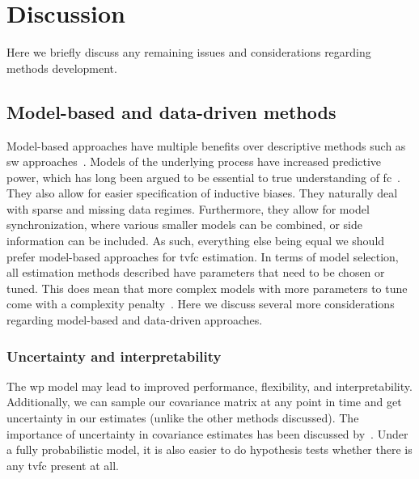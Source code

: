 \clearpage
\section{Discussion}\label{sec:methods-discussion}

Here we briefly discuss any remaining issues and considerations regarding methods development.

\subsection{Model-based and data-driven methods}\label{subsec:model-based-data-driven-methods}

Model-based approaches have multiple benefits over descriptive methods such as \gls{sw} approaches~\parencite{Foti2019}.
Models of the underlying process have increased predictive power, which has long been argued to be essential to true understanding of \gls{fc}~\parencite{Bassett2011}.
They also allow for easier specification of inductive biases.
They naturally deal with sparse and missing data regimes.
Furthermore, they allow for model synchronization, where various smaller models can be combined, or side information can be included.
As such, everything else being equal we should prefer model-based approaches for \gls{tvfc} estimation.
%
In terms of model selection, all estimation methods described have parameters that need to be chosen or tuned.
This does mean that more complex models with more parameters to tune come with a complexity penalty~\parencite[see also][]{Sculley2015}.
Here we discuss several more considerations regarding model-based and data-driven approaches.

\subsubsection{Uncertainty and interpretability}

The \gls{wp} model may lead to improved performance, flexibility, and interpretability.
Additionally, we can sample our covariance matrix at any point in time and get uncertainty in our estimates (unlike the other methods discussed).
The importance of uncertainty in covariance estimates has been discussed by~\textcite{Kudela2017}.
Under a fully probabilistic model, it is also easier to do hypothesis tests whether there is any \gls{tvfc} present at all.

